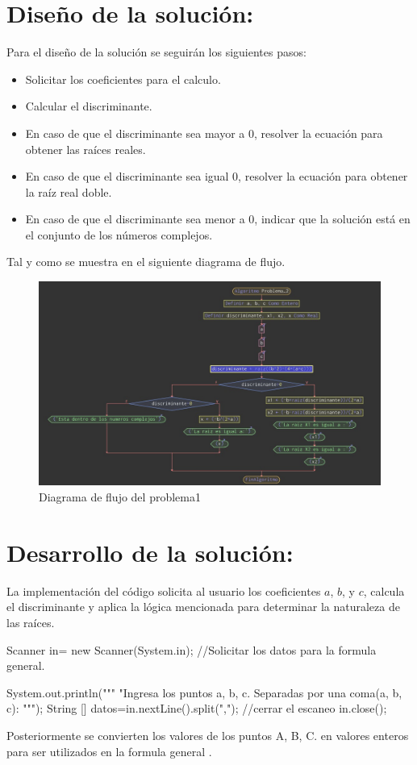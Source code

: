 \documentclass{IEEEcsmag}
\begin{document}
\section*{Diseño de la solución:}

Para el diseño de la solución se seguirán los siguientes pasos:
\begin{itemize}
    \item Solicitar los coeficientes para el calculo.
    \item Calcular el discriminante.
    \item En caso de que el discriminante sea mayor a 0, resolver la ecuación para obtener las raíces reales.
    \item En caso de que el discriminante sea igual 0, resolver la ecuación para obtener la raíz real doble.
    \item En caso de que el discriminante sea menor a 0, indicar que la solución está en el conjunto de los números complejos.
\end{itemize}

Tal y como se muestra en el siguiente diagrama de flujo.

\begin{figure}[h!]
    \centering
    \includegraphics[width = 6 cm]{latex-imagenes/a.jpeg}
    \caption{Diagrama de flujo del problema1}
    \label{fig:Diagramadeflujodel problema1}
\end{figure}

\section*{Desarrollo de la solución:}
La implementación del código solicita al usuario los coeficientes \(a\), \(b\), y \(c\), calcula el discriminante y aplica la lógica mencionada para determinar la naturaleza de las raíces. 
\begin{javaCode}
 Scanner in= new Scanner(System.in);
        //Solicitar los datos para la formula general.
        
        System.out.println("""
                           "Ingresa los puntos a, b, c.
                           Separadas por una coma(a, b, c): 
                           """);
        String [] datos=in.nextLine().split(",");
        //cerrar el escaneo
        in.close();
        
\end{javaCode}
Posteriormente se convierten los valores de los puntos A, B, C. en valores enteros para ser utilizados  en la formula general .
\end{document}
